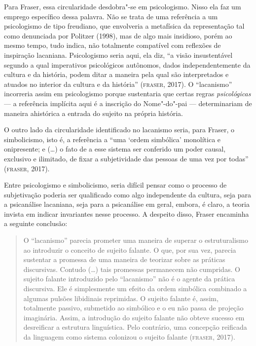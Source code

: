 Para Fraser, essa circularidade desdobra"-se em psicologismo. Nisso ela
faz um emprego específico dessa palavra. Não se trata de uma referência
a um psicologismo de tipo freudiano, que envolveria a metafísica da
representação tal como denunciada por Politzer (1998), mas de algo
mais insidioso, porém ao mesmo tempo, tudo indica, não totalmente
compatível com reflexões de inspiração lacaniana. Psicologismo seria
aqui, ela diz, ``a visão insustentável segundo a qual imperativos
psicológicos autônomos, dados independentemente da cultura e da
história, podem ditar a maneira pela qual são interpretados e
atuados no interior da cultura e da história'' (\textsc{fraser}, 2017). O
``lacanismo'' incorreria assim em psicologismo porque sustentaria que
certas regras \emph{psicológicas} --- a referência implícita aqui é a
inscrição do Nome"-do"-pai --- determinariam de maneira ahistórica a
entrada do sujeito na própria história.

O outro lado da circularidade identificado no lacanismo seria, para
Fraser, o simbolicismo, isto é, a referência a ``uma `ordem
simbólica' monolítica e onipresente; e (\ldots{}) o fato de a esse sistema
ser conferido um poder causal, exclusivo e ilimitado, de fixar a
subjetividade das pessoas de uma vez por todas'' (\textsc{fraser}, 2017).

Entre psicologismo e simbolicismo, seria difícil pensar como o
processo de subjetivação poderia ser qualificado como algo independente
da cultura, seja para a psicanálise lacaniana, seja para a psicanálise em
geral, embora, é claro, a teoria invista em indicar invariantes nesse
processo. A despeito disso, Fraser encaminha a seguinte conclusão:

\begin{quote}
O ``lacanismo'' parecia prometer uma maneira de superar o estruturalismo
ao introduzir o conceito de sujeito falante. O que, por sua vez, parecia
sustentar a promessa de uma maneira de teorizar sobre as práticas
discursivas. Contudo (\ldots{}) tais promessas permanecem não cumpridas. O
sujeito falante introduzido pelo ``lacanismo'' não é o agente da prática
discursiva. Ele é simplesmente um efeito da ordem simbólica combinado a
algumas pulsões libidinais reprimidas. O sujeito falante é, assim,
totalmente passivo, submetido ao simbólico e o eu não passa de projeção
imaginária. Assim, a introdução do sujeito falante não obteve sucesso em
desreificar a estrutura linguística. Pelo contrário, uma concepção
reificada da linguagem como sistema colonizou o sujeito falante
(\textsc{fraser}, 2017).
\end{quote}

